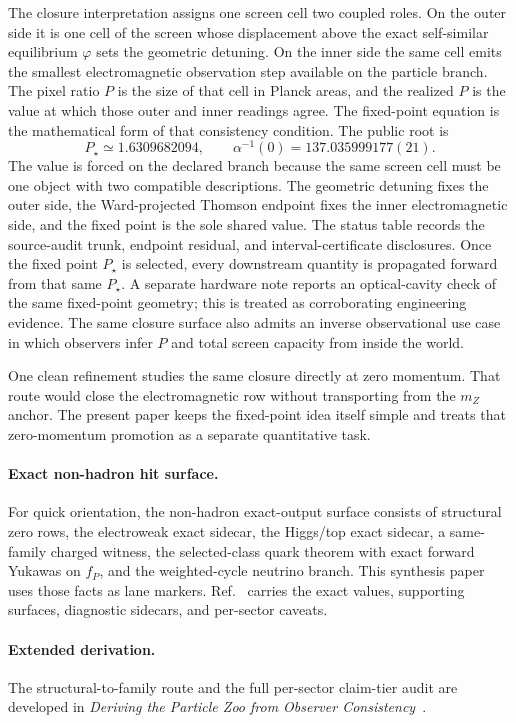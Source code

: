 The closure interpretation assigns one screen cell two coupled roles. On the outer side it is one
cell of the screen whose displacement above the exact self-similar equilibrium \(\varphi\) sets
the geometric detuning. On the inner side the same cell emits the smallest electromagnetic
observation step available on the particle branch. The pixel ratio \(P\) is the size of that cell
in Planck areas, and the realized \(P\) is the value at which those outer and inner readings
agree. The fixed-point equation is the mathematical form of that consistency condition. The public
root is
\[
P_\star\simeq1.6309682094,\qquad
\alpha^{-1}(0)=137.035999177(21).
\]
The value is forced on the declared branch because the same screen cell must be
one object with two compatible descriptions. The geometric detuning fixes the
outer side, the Ward-projected Thomson endpoint fixes the inner electromagnetic
side, and the fixed point is the sole shared value.
The status table records the source-audit trunk, endpoint residual, and interval-certificate
disclosures. Once the fixed point \(P_\star\) is selected, every downstream
quantity is propagated forward from that same \(P_\star\).
A separate hardware note reports an optical-cavity check of the same fixed-point geometry;
this is treated as corroborating engineering evidence.
The same closure surface also admits an inverse observational use case in which observers infer
\(P\) and total screen capacity from inside the world.

One clean refinement studies the same closure directly at zero momentum. That route would close the
electromagnetic row without transporting from the \(m_Z\) anchor. The present paper keeps the
fixed-point idea itself simple and treats that zero-momentum promotion as a separate quantitative
task.

\paragraph{Exact non-hadron hit surface.}
For quick orientation, the non-hadron exact-output surface consists of structural zero rows,
the electroweak exact sidecar, the Higgs/top exact sidecar, a same-family charged witness, the
selected-class quark theorem with exact forward Yukawas on \(f_P\), and the weighted-cycle
neutrino branch. This synthesis paper uses those facts as lane markers. Ref.~\cite{ophparticles}
carries the exact values, supporting surfaces, diagnostic sidecars, and per-sector caveats.

\paragraph{Extended derivation.}
The structural-to-family route and the full per-sector claim-tier audit are developed in
\emph{Deriving the Particle Zoo from Observer Consistency}~\cite{ophparticles}.

